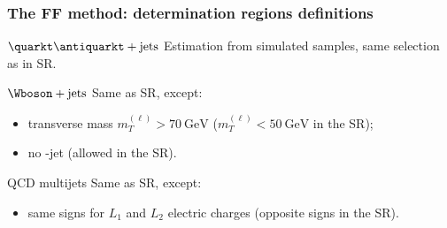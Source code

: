 %

\begin{frame}
\frametitle{The FF method: determination regions definitions}

\begin{block}{$\quarkt\antiquarkt+\text{jets}$}
Estimation from simulated samples, same selection as in SR.
\end{block}

\pause\vfill

\begin{block}{$\Wboson+\text{jets}$}
Same as SR, except:
\begin{itemize}
\item transverse mass $m_T^{(\ell)}>\SI{70}{\GeV}$ ($m_T^{(\ell)}<\SI{50}{\GeV}$ in the SR);
\item no \quarkb-jet (allowed in the SR).
\end{itemize}
\end{block}

\pause\vfill

\begin{block}{QCD multijets}
Same as SR, except:
\begin{itemize}
\item same signs for $L_1$ and $L_2$ electric charges (opposite signs in the SR).
\end{itemize}
\end{block}

\end{frame}


